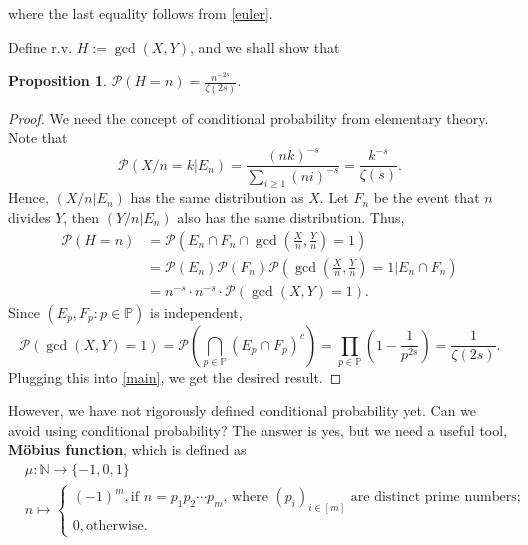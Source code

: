 \documentclass[12pt]{article}
\newtheorem{proposition}[theorem]{Proposition}
\newcommand\N{\mathbb{N}}
\newcommand\pp{\mathcal{P}}
\newcommand\PP{\mathbb{P}}
\newcommand\pr[1]{\mathcal{P} \left( #1\right)}
\begin{document}
where the last equality follows from \cref{euler}.

Define r.v. $H := \gcd(X,Y)$, and we shall show that
\begin{proposition} \label{gcd}
    $\pp(H = n) = \frac{n^{-2s}}{\zeta(2s)}$.
\end{proposition}
\begin{proof}
    We need the concept of conditional probability 
    from elementary theory. Note that 
    $$
        \pr{X/n = k| E_n}
        = \frac{(nk)^{-s}}{\sum_{i \geq 1}(ni)^{-s}} 
        = \frac{k^{-s}}{\zeta(s)}.
    $$
    Hence, $(X/n | E_n)$ has the same distribution as $X$.
    Let $F_n$ be the event that $n$ divides $Y$, 
    then $(Y/n|E_n)$ also has the same distribution.
    Thus,
    \begin{equation} \label{main}
    \begin{aligned}
        \pp(H = n) &= \pr{E_n \cap F_n \cap {\gcd (\frac{X}{n},\frac{Y}{n}) = 1}} \\
         &= \pp(E_n) \pp(F_n) \pr{\gcd (\frac{X}{n},\frac{Y}{n}) = 1 | E_n \cap F_n} \\
         &= n^{-s} \cdot n^{-s} \cdot \pp(\gcd(X,Y) = 1).
    \end{aligned}
    \end{equation}
    Since $(E_p,F_p: p\in\PP)$ is independent, 
    $$
        \pp(\gcd(X,Y) = 1) = \pp(\bigcap_{p \in \PP}(E_p \cap F_p)^c)
        = \prod_{p\in \PP} (1 - \frac{1}{p^{2s}}) = \frac{1}{\zeta(2s)}.
    $$
    Plugging this into \cref{main}, we get the desired result.
\end{proof}

However, we have not rigorously defined conditional probability yet.
Can we avoid using conditional probability?
The answer is yes, but we need a useful tool, \textbf{Möbius function},
which is defined as 
\begin{align*}
    &\mu : \N \to \{-1,0,1\} \\
     &n \mapsto \begin{cases}
        (-1)^{m}, \text{if $n = p_1p_2\cdots p_m$, where $(p_i)_{i \in [m]}$ are distinct prime numbers};\\
        0, \text{otherwise}.
    \end{cases}
\end{align*}
\end{document}
